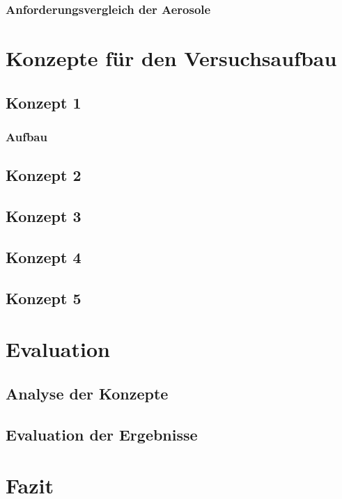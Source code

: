 \subsection{Anforderungsvergleich der Aerosole}


\chapter{Konzepte f\"{u}r den Versuchsaufbau}\label{ch:implementation}
\section{Konzept 1}
\subsection{Aufbau}
\section{Konzept 2}
\section{Konzept 3}
\section{Konzept 4}
\section{Konzept 5}


\chapter{Evaluation}\label{ch:conclusion}

\section{Analyse der Konzepte}
\section{Evaluation der Ergebnisse}

\chapter{Fazit}\label{ch:conclusion}


